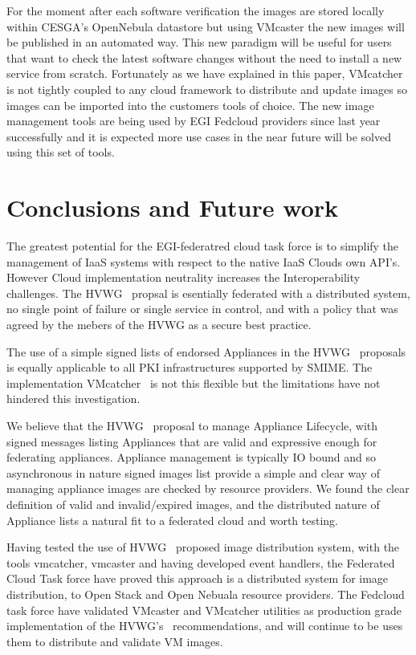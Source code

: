 \documentclass{llncs_Ibergrid2013}
\begin{document}
For the moment after each software verification the images are stored locally within CESGA's OpenNebula datastore but using VMcaster the new images will be published in an automated way.
This new paradigm will be useful for users that want to check the latest software changes without the need to install a new service from scratch.
Fortunately as we have explained in this paper, VMcatcher is not tightly coupled to any cloud framework to distribute and update images so images can be imported into the customers tools of choice. The new image management tools are being used by EGI Fedcloud providers since last year successfully and it is expected more use cases in the near future will be solved using this set of tools.

\section{Conclusions and Future work}
\label{sect-conclusions}
The greatest potential for the EGI-federatred cloud task force is to simplify the management of IaaS systems with respect to the native IaaS Clouds own API's. However Cloud implementation neutrality increases the Interoperability challenges. The HVWG~\cite{hepix} propsal is esentially federated with a distributed system, no single point of failure or single service in control, and with a policy that was agreed by the mebers of the HVWG as a secure best practice.

The use of a simple signed lists of endorsed Appliances in the HVWG~\cite{hepix} proposals is equally applicable to all PKI infrastructures supported by SMIME. The implementation VMcatcher~\cite{vmcatcher} is not this flexible but the limitations have not hindered this investigation.

We believe that the HVWG~\cite{hepix} proposal to manage Appliance Lifecycle, with signed messages listing Appliances that are valid and expressive enough for federating appliances. Appliance management is typically IO bound and so asynchronous in nature signed images list provide a simple and clear way of managing appliance images are checked by resource providers. We found the clear definition of valid and invalid/expired images, and the distributed nature of Appliance lists a natural fit to a federated cloud and worth testing.

Having tested the use of HVWG~\cite{hepix} proposed image distribution system, with the tools vmcatcher, vmcaster and having developed event handlers, the Federated Cloud Task force have proved this approach is a distributed system for image distribution, to Open Stack and Open Nebuala resource providers. The Fedcloud task force have validated VMcaster and VMcatcher utilities as production grade implementation of the HVWG's~\cite{hepix} recommendations, and will continue to be uses them to distribute and validate VM images.
\end{document}
